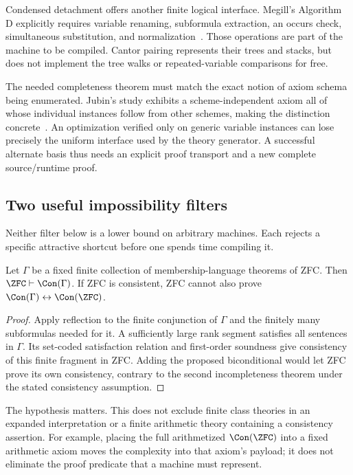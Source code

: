 Condensed detachment offers another finite logical interface.  Megill's
Algorithm D explicitly requires variable renaming, subformula extraction,
an occurs check, simultaneous substitution, and normalization~\cite{megill}.
Those operations are part of the machine to be compiled.  Cantor pairing
represents their trees and stacks, but does not implement the tree walks
or repeated-variable comparisons for free.

The needed completeness theorem must match the exact notion of axiom
schema being enumerated.  Jubin's study exhibits a scheme-independent
axiom all of whose individual instances follow from other schemes, making
the distinction concrete~\cite{jubin}.  An optimization verified only
on generic variable instances can lose precisely the uniform interface
used by the theory generator.  A successful alternate basis thus needs
an explicit proof transport and a new complete source/runtime proof.

\subsection{Two useful impossibility filters}

Neither filter below is a lower bound on arbitrary machines.  Each
rejects a specific attractive shortcut before one spends time compiling it.

\begin{proposition}
Let $\Gamma$ be a fixed finite collection of membership-language theorems
of ZFC.  Then $\ZFC\vdash\Con(\Gamma)$.  If ZFC is consistent, ZFC
cannot also prove $\Con(\Gamma)\leftrightarrow\Con(\ZFC)$.
\end{proposition}

\begin{proof}
Apply reflection to the finite conjunction of $\Gamma$ and the finitely
many subformulas needed for it.  A sufficiently large rank segment
satisfies all sentences in $\Gamma$.  Its set-coded satisfaction relation
and first-order soundness give consistency of this finite fragment in
ZFC.  Adding the proposed biconditional would let ZFC prove its own
consistency, contrary to the second incompleteness theorem under the
stated consistency assumption.
\end{proof}

The hypothesis matters.  This does not exclude finite class theories in
an expanded interpretation or a finite arithmetic theory containing a
consistency assertion.  For example, placing the full arithmetized
$\Con(\ZFC)$ into a fixed arithmetic axiom moves the complexity into
that axiom's payload; it does not eliminate the proof predicate that a
machine must represent.

